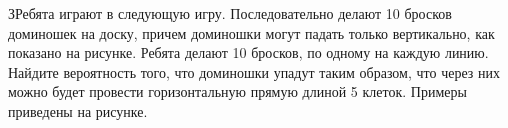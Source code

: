 
ЗРебята играют в следующую игру. Последовательно делают 10 бросков доминошек на доску, 
причем доминошки могут падать только вертикально, как показано на рисунке. Ребята делают 10 бросков, 
по одному на каждую линию. Найдите вероятность того, что доминошки упадут таким образом, что через них можно 
будет провести горизонтальную прямую длиной 5 клеток. Примеры приведены на рисунке.


